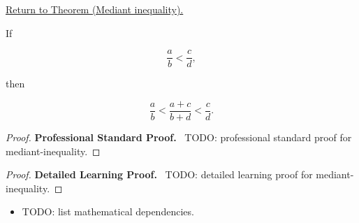 \newpage
{}
\label{prf:mediant-inequality}

\begin{remark*}[Return]
\hyperref[prop:mediant-inequality]{Return to Theorem (Mediant inequality).}
\end{remark*}

\begin{theorem*}
If

\[
\frac{a}{b} < \frac{c}{d},
\]

then

\[
\frac{a}{b}
<
\frac{a+c}{b+d}
<
\frac{c}{d}.
\]
\end{theorem*}

\begin{proof}
\textbf{Professional Standard Proof.}~
TODO: professional standard proof for mediant-inequality.
\end{proof}

\begin{proof}
\textbf{Detailed Learning Proof.}~
TODO: detailed learning proof for mediant-inequality.
\end{proof}

\begin{remark*}
\end{remark*}

\begin{dependencies}
\begin{itemize}
  \item TODO: list mathematical dependencies.
\end{itemize}
\end{dependencies}

\clearpage
